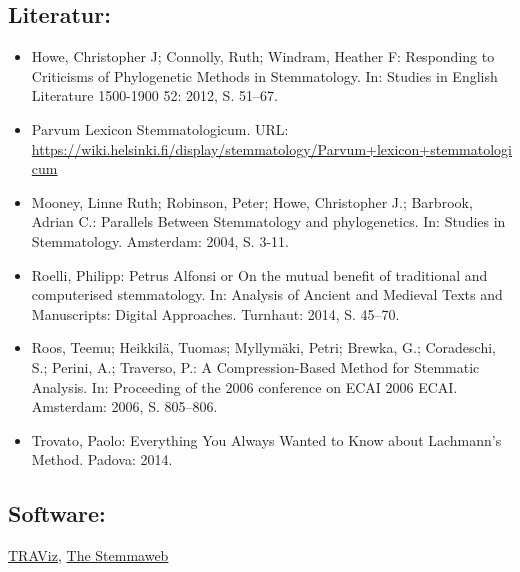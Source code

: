 \documentclass{article}
\begin{document}
        \subsection*{Literatur:}\begin{itemize}\item Howe, Christopher J; Connolly, Ruth; Windram, Heather F: Responding to Criticisms of Phylogenetic Methods in
                              Stemmatology. In: Studies in English Literature 1500-1900 52: 2012, S. 51–67.\item Parvum Lexicon Stemmatologicum. URL: \url{https://wiki.helsinki.fi/display/stemmatology/Parvum+lexicon+stemmatologicum}\item Mooney, Linne Ruth; Robinson, Peter; Howe, Christopher J.; Barbrook, Adrian C.: Parallels Between Stemmatology and
                              phylogenetics. In: Studies in Stemmatology. Amsterdam: 2004, S. 3-11.\item Roelli, Philipp: Petrus Alfonsi or On the mutual benefit of traditional
                              and computerised stemmatology. In: Analysis of Ancient and Medieval Texts and Manuscripts:
                              Digital Approaches. Turnhaut: 2014, S. 45–70.\item Roos, Teemu; Heikkilä, Tuomas; Myllymäki, Petri; Brewka, G.; Coradeschi, S.; Perini, A.; Traverso, P.: A Compression-Based Method for Stemmatic
                              Analysis. In: Proceeding of the 2006 conference on ECAI 2006 ECAI. Amsterdam: 2006, S. 805–806.\item Trovato, Paolo: Everything You Always Wanted to Know about Lachmann's
                              Method. Padova: 2014.\end{itemize}\subsection*{Software:}\href{http://www.traviz.vizcovery.org}{TRAViz}, \href{https://stemmaweb.net/}{The Stemmaweb
}
\end{document}
